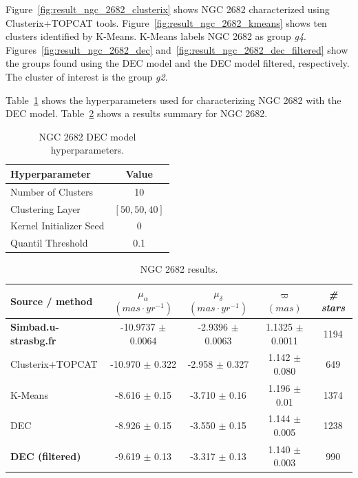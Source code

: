 \documentclass[11pt, a4paper, english]{book}
\begin{document}
\newpage

Figure~\ref{fig:result_ngc_2682_clusterix} shows NGC 2682 characterized using Clusterix+TOPCAT tools.
Figure~\ref{fig:result_ngc_2682_kmeans} shows ten clusters identified by K-Means.
K-Means labels NGC 2682 as group \emph{g4}.
Figures~\ref{fig:result_ngc_2682_dec} and~\ref{fig:result_ngc_2682_dec_filtered}
show the groups found using the DEC model and the DEC model filtered, respectively.
The cluster of interest is the group \emph{g2}.

Table~\ref{tab:hyperparameters_ngc_2682} shows the hyperparameters used for characterizing NGC 2682
with the DEC model. Table~\ref{tab:results_ngc_2682} shows a results summary for NGC 2682.

\vfill

\begin{table}[h]
  \begin{center}
    \begin{tabular}{l|c}
      \textbf{Hyperparameter} & \textbf{Value} \\
      \hline
      Number of Clusters & 10 \\
      Clustering Layer & \(\left[ 50, 50, 40 \right]\) \\
      Kernel Initializer Seed & 0 \\
      Quantil Threshold & 0.1 \\
    \end{tabular}
    \caption{NGC 2682 DEC model hyperparameters.}
    \label{tab:hyperparameters_ngc_2682}
  \end{center}
\end{table}

\vfill

\begin{table}[h]
  \begin{center}
    \begin{tabular}{l|c|c|c|c}
      \textbf{Source / method} & \emph{\(\mu_{\alpha}\) \((mas \cdot yr^{-1})\)} & \emph{\(\mu_{\delta}\) \((mas \cdot yr^{-1})\)}
      & \emph{\( \varpi \) \((mas)\)} & \emph{\# stars} \\
      \hline
      \textbf{Simbad.u-strasbg.fr} & -10.9737 \( \pm \) 0.0064 & -2.9396 \( \pm \) 0.0063 & 1.1325 \( \pm \) 0.0011 & 1194 \\
      Clusterix+TOPCAT & -10.970 \( \pm \) 0.322 & -2.958 \( \pm \) 0.327 & 1.142 \( \pm \) 0.080 & 649 \\
      K-Means & -8.616 \( \pm \) 0.15 & -3.710 \( \pm \) 0.16 & 1.196 \( \pm \) 0.01 & 1374 \\
      DEC & -8.926 \( \pm \) 0.15 & -3.550 \( \pm \) 0.15 & 1.144 \( \pm \) 0.005 & 1238 \\
      \textbf{DEC (filtered)} & -9.619 \( \pm \) 0.13 & -3.317 \( \pm \) 0.13 & 1.140 \( \pm \) 0.003 & 990 \\
    \end{tabular}
    \caption{NGC 2682 results.}
    \label{tab:results_ngc_2682}
  \end{center}
\end{table}
\end{document}

